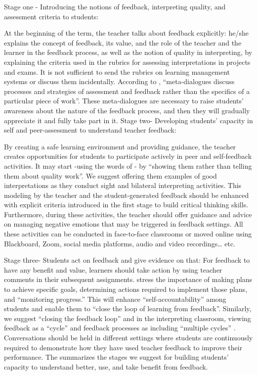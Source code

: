 \documentclass[english]{textolivre}
\begin{document}
Stage one - Introducing the notions of feedback, interpreting quality, and assessment criteria to students:

At the beginning of the term, the teacher talks about feedback explicitly: he/she explains the concept of feedback, its value, and the role of the teacher and the learner in the feedback process, as well as the notion of quality in interpreting, by explaining the criteria used in the rubrics for assessing interpretations in projects and exams. It is not sufficient to send the rubrics on learning management systems or discuss them incidentally. According to \textcite[p.1322]{carless_development_2018}, “meta-dialogues discuss processes and strategies of assessment and feedback rather than the specifics of a particular piece of work”. These meta-dialogues are necessary to raise students’ awareness about the nature of the feedback process, and then they will gradually appreciate it and fully take part in it.
Stage two- Developing students’ capacity in self and peer-assessment to understand teacher feedback:

By creating a safe learning environment and providing guidance, the teacher creates opportunities for students to participate actively in peer and self-feedback activities. It may start -using the words of \textcite[p. 1321]{carless_development_2018} - by “showing them rather than telling them about quality work”. We suggest offering them examples of good interpretations as they conduct sight and bilateral interpreting activities. This modeling by the teacher and the student-generated feedback should be enhanced with explicit criteria introduced in the first stage to build critical thinking skills. Furthermore, during these activities, the teacher should offer guidance and advice on managing negative emotions that may be triggered in feedback settings. All these activities can be conducted in face-to-face classrooms or moved online using Blackboard, Zoom, social media platforms, audio and video recordings… etc.

Stage three- Students act on feedback and give evidence on that:
For feedback to have any benefit and value, learners should take action by using teacher comments in their subsequent assignments. \textcite[p. 11]{hoo_developing_2022} stress the importance of making plans to achieve specific goals, determining actions required to implement those plans, and “monitoring progress.” This will enhance “self-accountability” among students and enable them to “close the loop of learning from feedback”. Similarly, we suggest “closing the feedback loop” \cite[p. 1323]{carless_development_2018} and \cite[p. 11]{hoo_developing_2022} in the interpreting classroom, viewing feedback as a “cycle” \cite{van_de_ridder_what_2008} and feedback processes as including “multiple cycles” \cite[p  47]{omer_criteria_2017}. Conversations should be held in different settings where students are continuously required to demonstrate how they have used teacher feedback to improve their performance. The  summarizes the stages we suggest for building students’ capacity to understand better, use, and take benefit from feedback.
\end{document}
